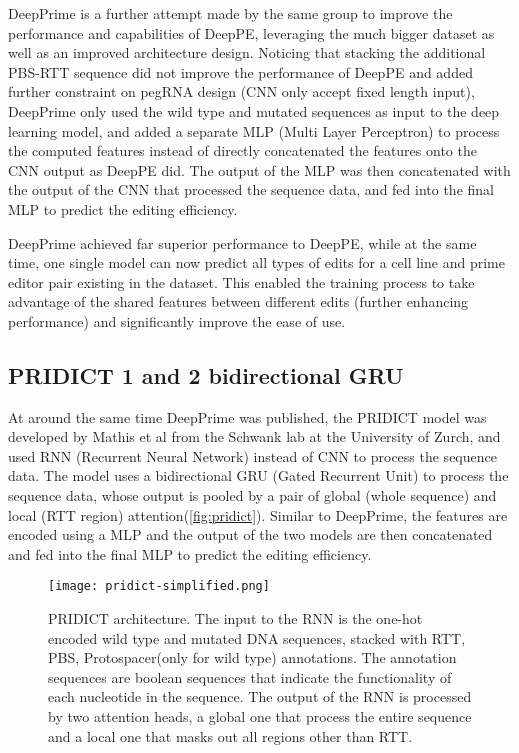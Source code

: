 DeepPrime is a further attempt made by the same group to improve the performance and capabilities of DeepPE, leveraging the much bigger dataset as well as an improved architecture design\cite{yuPredictionEfficienciesDiverse2023}.
Noticing that stacking the additional PBS-RTT sequence did not improve the performance of DeepPE and added further constraint on pegRNA design (CNN only accept fixed length input), DeepPrime only used the wild type and mutated sequences as input to the deep learning model, and added a separate MLP (Multi Layer Perceptron) to process the computed features instead of directly concatenated the features onto the CNN output as DeepPE did. The output of the MLP was then concatenated with the output of the CNN that processed the sequence data, and fed into the final MLP to predict the editing efficiency. 

DeepPrime achieved far superior performance to DeepPE, while at the same time, one single model can now predict all types of edits for a cell line and prime editor pair existing in the dataset. This enabled the training process to take advantage of the shared features between different edits (further enhancing performance) and significantly improve the ease of use.

\subsection{PRIDICT 1 and 2 bidirectional GRU}

At around the same time DeepPrime was published, the PRIDICT model was developed by Mathis et al from the Schwank lab at the University of Zurch, and used RNN (Recurrent Neural Network) instead of CNN to process the sequence data\cite{mathisPredictingPrimeEditing2023}. The model uses a bidirectional GRU (Gated Recurrent Unit) to process the sequence data, whose output is pooled by a pair of global (whole sequence) and local (RTT region) attention(\autoref{fig:pridict}). Similar to DeepPrime, the features are encoded using a MLP and the output of the two models are then concatenated and fed into the final MLP to predict the editing efficiency.

\begin{figure}
    \centering
    \texttt{[image: pridict-simplified.png]}
    \caption[PRIDICT architecture]{PRIDICT architecture. The input to the RNN is the one-hot encoded wild type and mutated DNA sequences, stacked with RTT, PBS, Protospacer(only for wild type) annotations. The annotation sequences are boolean sequences that indicate the functionality of each nucleotide in the sequence. The output of the RNN is processed by two attention heads, a global one that process the entire sequence and a local one that masks out all regions other than RTT. }
    \label{fig:pridict}
\end{figure}

